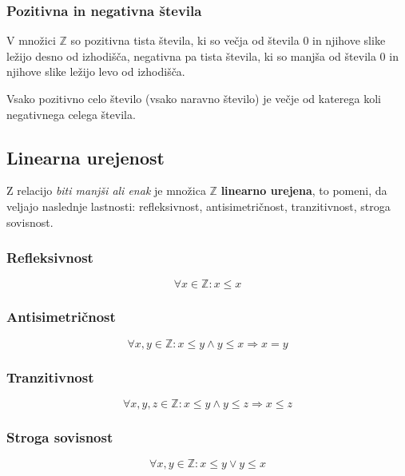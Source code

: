     \subsubsection*{Pozitivna in negativna števila}
        V množici $\mathbb{Z}$ so pozitivna tista števila, ki so večja od števila $0$ 
        in njihove slike ležijo desno od izhodišča, 
        negativna pa tista števila, ki so manjša od števila $0$ 
        in njihove slike ležijo levo od izhodišča.
    
        Vsako pozitivno celo število (vsako naravno število) je večje od katerega koli negativnega celega števila.
    



    


        \subsection{Linearna urejenost}

    
        Z relacijo \textit{biti manjši ali enak} je množica $\mathbb{Z}$ \textbf{linearno urejena}, 
        to pomeni, da veljajo naslednje lastnosti: refleksivnost, antisimetričnost, tranzitivnost, stroga sovisnost.
    
    
        \subsubsection*{Refleksivnost}
        $$\forall x\in\mathbb{Z}: x\leq x$$
    

        \subsubsection*{Antisimetričnost}
        $$\forall x,y\in\mathbb{Z}: x\leq y \land y\leq x \Rightarrow x=y$$
    

        \subsubsection*{Tranzitivnost}
        $$\forall x,y,z\in\mathbb{Z}: x\leq y \land y\leq z \Rightarrow x\leq z$$
    

        \subsubsection*{Stroga sovisnost}
        $$\forall x,y\in\mathbb{Z}: x\leq y \lor y\leq x$$

    



